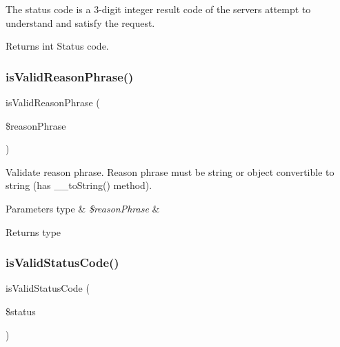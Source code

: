 The status code is a 3-\/digit integer result code of the server\textquotesingle{}s attempt to understand and satisfy the request.

\begin{DoxyReturn}{Returns}
int Status code. 
\end{DoxyReturn}
\mbox{\label{class_pes_1_1_http_1_1_response_a6d3d6ad45feb397f6a7591d0c2c65234}} 
\subsubsection{\texorpdfstring{is\+Valid\+Reason\+Phrase()}{isValidReasonPhrase()}}
{\footnotesize\ttfamily is\+Valid\+Reason\+Phrase (\begin{DoxyParamCaption}\item[{}]{\$reason\+Phrase }\end{DoxyParamCaption})\hspace{0.3cm}{\ttfamily [protected]}}

Validate reason phrase. Reason phrase must be string or object convertible to string (has \+\_\+\+\_\+to\+String() method). 
\begin{DoxyParams}[1]{Parameters}
type & {\em \$reason\+Phrase} & \\
\hline
\end{DoxyParams}
\begin{DoxyReturn}{Returns}
type 
\end{DoxyReturn}
\mbox{\label{class_pes_1_1_http_1_1_response_a8d86609842e7a0a93c0be183b70dbd30}} 
\subsubsection{\texorpdfstring{is\+Valid\+Status\+Code()}{isValidStatusCode()}}
{\footnotesize\ttfamily is\+Valid\+Status\+Code (\begin{DoxyParamCaption}\item[{}]{\$status }\end{DoxyParamCaption})\hspace{0.3cm}{\ttfamily [protected]}}

